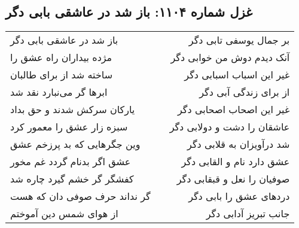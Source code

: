 \begin{center}
\section*{غزل شماره ۱۱۰۴: باز شد در عاشقی بابی دگر}
\label{sec:1104}
\begin{longtable}{l p{0.5cm} r}
باز شد در عاشقی بابی دگر
&&
بر جمال یوسفی تابی دگر
\\
مژده بیداران راه عشق را
&&
آنک دیدم دوش من خوابی دگر
\\
ساخته شد از برای طالبان
&&
غیر این اسباب اسبابی دگر
\\
ابرها گر می‌نبارد نقد شد
&&
از برای زندگی آبی دگر
\\
یارکان سرکش شدند و حق بداد
&&
غیر این اصحاب اصحابی دگر
\\
سبزه زار عشق را معمور کرد
&&
عاشقان را دشت و دولابی دگر
\\
وین جگرهایی که بد پرزخم عشق
&&
شد درآویزان به قلابی دگر
\\
عشق اگر بدنام گردد غم مخور
&&
عشق دارد نام و القابی دگر
\\
کفشگر گر خشم گیرد چاره شد
&&
صوفیان را نعل و قبقابی دگر
\\
گر نداند حرف صوفی دان که هست
&&
دردهای عشق را بابی دگر
\\
از هوای شمس دین آموختم
&&
جانب تبریز آدابی دگر
\\
\end{longtable}
\end{center}
